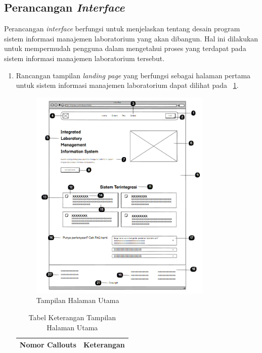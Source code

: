 \subsection{Perancangan \textit{Interface}}
Perancangan \textit{interface} berfungsi untuk menjelaskan tentang desain program sistem informasi manajemen laboratorium yang akan dibangun. Hal ini dilakukan untuk mempermudah pengguna dalam mengetahui proses yang terdapat pada sistem informasi manajemen laboratorium tersebut.

\begin{enumerate}
	\item Rancangan tampilan \textit{landing page} yang berfungsi sebagai halaman pertama untuk sistem informasi manajemen laboratorium dapat dilihat pada \pic~\ref{fig:kelola-jadwal-1}.
	      \begin{figure}
		      \centering
		      \includegraphics[width=0.82\textwidth]{konten/gambar/landing-page.png}
		      \caption{Tampilan Halaman Utama}
		      \label{fig:kelola-jadwal-1}
	      \end{figure}

	      \begin{longtable}{c p{}}
		      \caption{Tabel Keterangan Tampilan Halaman Utama}                                                                                               \\
		      \hline
		      \textbf{Nomor Callouts} & \textbf{Keterangan}                                                                                                   \\
		      \hline
		      \endfirsthead


\end{longtable}
\end{enumerate}
